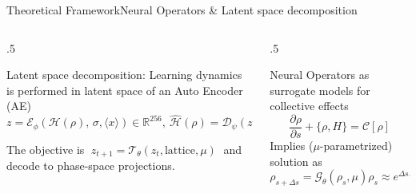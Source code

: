 \documentclass[aspectratio=169,t,11pt,table]{beamer}
{\setbeamercovered{transparent}}
\begin{document}
\begin{frame}{Theoretical Framework}{Neural Operators \& Latent space decomposition}
  \vspace{-1cm}
  \begin{columns}[T]
    \begin{column}{.5\textwidth}
        \begin{purpleBlock}{\centering\small{Latent space decomposition:}}
        \vspace{-0.2cm}
        \small
        Learning dynamics is performed in latent space of an Auto Encoder (AE)
        \[
          z = \mathcal{E}_\phi(\mathcal{H}(\rho),\,\sigma,\langle x\rangle)\in\mathbb{R}^{256},\ 
          \widehat{\mathcal{H}}(\rho)=\mathcal{D}_\psi(z).
        \]
        \vspace{0.1cm}

         The objective is $\; z_{t+1} = \mathcal{T}_\theta(z_t, \text{lattice}, \mu)\;$ and decode to phase-space projections.
      \end{purpleBlock}
      
         \end{column}
    \hfill
    \begin{column}{.5\textwidth}
      \begin{purpleBlock}{\centering\small{Neural Operators as surrogate models for collective effects}}
        \[
          \frac{\partial \rho}{\partial s} + \{\rho,H\} = \mathcal{C}[\rho]
        \]
        Implies ($\mu$-parametrized) solution as 
        \[
            \rho_{s+\Delta s}=\mathcal{G}_\theta(\rho_s,\mu)\rho_s \approx e^{\Delta s \mathcal{L}_ {\mathrm{wake}}} e^{\Delta s \mathcal{L}_{\mathrm{ext}}}\rho_s.
        \]
        
      \end{purpleBlock}
    \end{column}
  \end{columns}
 	
  
  \bottomleft{
  }
\end{frame}
\end{document}
